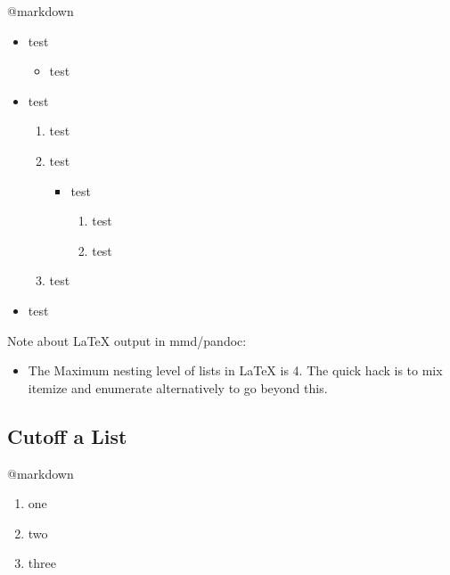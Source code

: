 @markdown

\begin{itemize}
\item test

\begin{itemize}
\item test

\end{itemize}

\item test

\begin{enumerate}
\item test

\item test

\begin{itemize}
\item test

\begin{enumerate}
\item test

\item test

\end{enumerate}

\end{itemize}

\item test

\end{enumerate}

\item test

\end{itemize}

Note about LaTeX output in mmd\slash pandoc:

\begin{itemize}
\item The Maximum nesting level of lists in LaTeX is 4. The quick hack is to mix itemize and enumerate alternatively to go beyond this.

\end{itemize}

\subsection{Cutoff a List}
\label{cutoffalist}

@markdown

\begin{enumerate}
\item one

\item two

\item three

\end{enumerate}

